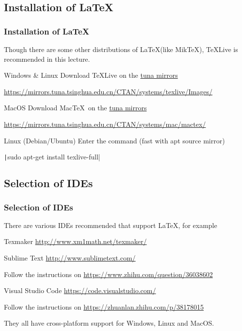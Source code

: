 \subsection{Installation of \LaTeX}
\begin{frame}
	\frametitle{Installation of \LaTeX}
	Though there are some other distributions of \LaTeX (like Mik\TeX), \TeX Live is recommended in this lecture.
	\begin{block}{Windows \& Linux}
		Download \TeX Live on the \href{https://mirrors.tuna.tsinghua.edu.cn/}{tuna mirrors}
		\smallskip
				
		\small{\url{https://mirrors.tuna.tsinghua.edu.cn/CTAN/systems/texlive/Images/}}
	\end{block}
	\begin{block}{MacOS}
		Download Mac\TeX\ on the \href{https://mirrors.tuna.tsinghua.edu.cn/}{tuna mirrors}		
		\smallskip
		
		\small{\url{https://mirrors.tuna.tsinghua.edu.cn/CTAN/systems/mac/mactex/}}
	\end{block}
	\begin{block}{Linux (Debian/Ubuntu)}
		Enter the command (fast with apt source mirror) 
		\smallskip
		
		\texttt|sudo apt-get install texlive-full|
	\end{block}
\end{frame}

\subsection{Selection of IDEs}

\begin{frame}
	\frametitle{Selection of IDEs}
	\small
	There are various IDEs recommended that support \LaTeX , for example
	\begin{block}{Texmaker}
		\url{http://www.xm1math.net/texmaker/}
	\end{block}
	 
	\begin{block}{Sublime Text}
		\url{http://www.sublimetext.com/}
	\end{block}
	Follow the instructions on \url{https://www.zhihu.com/question/36038602}
	
	\begin{block}{Visual Studio Code}
		\url{https://code.visualstudio.com/}
	\end{block}
	Follow the instructions on \url{https://zhuanlan.zhihu.com/p/38178015}
	\bigskip
	
	They all have cross-platform support for Windows, Linux and MacOS.
\end{frame}

